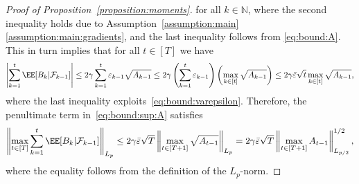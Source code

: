 \documentclass[11pt, a4paper, oneside, reqno]{article}
\begin{document}
\begin{proof}[Proof of Proposition~\ref{proposition:moments}]
		for all $k\in\mathbb N$, where the second inequality holds due to Assumption~\ref{assumption:main}\,\ref{assumption:main:gradients}, and the last inequality follows from \eqref{eq:bound:A}. This in turn implies that for all $t \in [T]$ we have
		\begin{align*}
		\left| \sum_{k=1}^t \EE[B_k | \mathcal F_{k-1}] \right|
		\leq 2 \gamma \sum_{k=1}^t \varepsilon_{k-1} \sqrt{A_{k-1}}
		\leq 2 \gamma \left( \sum_{k=1}^t \varepsilon_{k-1} \right) \left( \max_{k \in [t]} \sqrt{A_{k-1}} \right)
		\leq 2 \gamma \bar \varepsilon \sqrt{t} \max_{k \in [t]} \sqrt{A_{k-1}},
		\end{align*}
		where the last inequality exploits~\eqref{eq:bound:varepsilon}. Therefore, the penultimate term in~\eqref{eq:bound:sup:A} satisfies
		\begin{align}
		\label{eq:B_k:1}
		\left\| \max_{t \in [T]} \sum_{k=1}^t \EE[B_k | \mathcal F_{k-1}] \right\|_{L_p}
		\leq 2 \gamma \bar \varepsilon \sqrt{T} \left\| \max_{t \in [T+1]} \sqrt{A_{t-1}} \right\|_{L_p}
		= 2 \gamma \bar \varepsilon \sqrt{T} \left\| \max_{t \in [T+1]} A_{t-1} \right\|_{L_{p/2}}^{1/2},
		\end{align}
		where the equality follows from the definition of the $L_p$-norm.
		

\end{proof}
\end{document}
